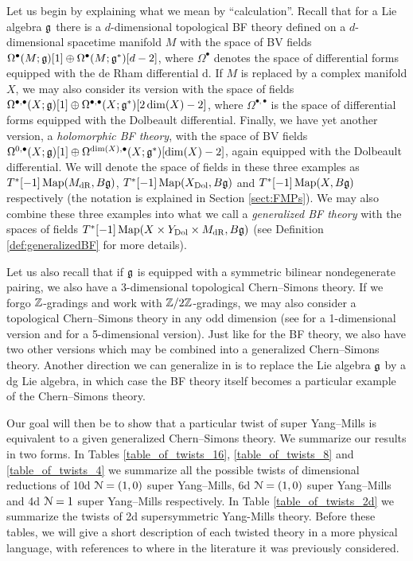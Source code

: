 \documentclass[10pt, oneside]{article}
\begin{document}
Let us begin by explaining what we mean by ``calculation''. Recall that for a Lie algebra $\mathfrak g$ there is a $d$-dimensional topological BF theory defined on a $d$-dimensional spacetime manifold $M$ with the space of BV fields $\Omega^\bullet(M; \mathfrak g)[1]\oplus \Omega^\bullet(M; \mathfrak g^*)[d-2]$, where $\Omega^\bullet$ denotes the space of differential forms equipped with the de Rham differential $\mathrm{d}$. If $M$ is replaced by a complex manifold $X$, we may also consider its version with the space of fields $\Omega^{\bullet, \bullet}(X; \mathfrak g)[1]\oplus \Omega^{\bullet, \bullet}(X; \mathfrak g^*)[2\dim(X)-2]$, where $\Omega^{\bullet, \bullet}$ is the space of differential forms equipped with the Dolbeault differential. Finally, we have yet another version, a \emph{holomorphic BF theory}, with the space of BV fields $\Omega^{0, \bullet}(X; \mathfrak g)[1]\oplus \Omega^{\dim(X), \bullet}(X; \mathfrak g^*)[\dim(X)-2]$, again equipped with the Dolbeault differential. We will denote the space of fields in these three examples as $T^*[-1]\operatorname{Map}(M_{\mathrm{dR}}, B\mathfrak g)$, $T^*[-1]\operatorname{Map}(X_{\mathrm{Dol}}, B\mathfrak g)$ and $T^*[-1]\operatorname{Map}(X, B\mathfrak g)$ respectively (the notation is explained in Section \ref{sect:FMPs}). We may also combine these three examples into what we call a \emph{generalized BF theory} with the spaces of fields $T^*[-1]\operatorname{Map}(X\times Y_{\mathrm{Dol}}\times M_{\mathrm{dR}}, B\mathfrak g)$ (see Definition \ref{def:generalizedBF} for more details).

Let us also recall that if $\mathfrak g$ is equipped with a symmetric bilinear nondegenerate pairing, we also have a 3-dimensional topological Chern--Simons theory. If we forgo $\mathbb Z$-gradings and work with $\mathbb Z/2\mathbb Z$-gradings, we may also consider a topological Chern--Simons theory in any odd dimension (see \cite{AlekseevMnev} for a 1-dimensional version and \cite{BakGustavsson2} for a 5-dimensional version). Just like for the BF theory, we also have two other versions which may be combined into a generalized Chern--Simons theory. Another direction we can generalize in is to replace the Lie algebra $\mathfrak g$ by a dg Lie algebra, in which case the BF theory itself becomes a particular example of the Chern--Simons theory.

Our goal will then be to show that a particular twist of super Yang--Mills is equivalent to a given generalized Chern--Simons theory. We summarize our results in two forms. In Tables \ref{table_of_twists_16}, \ref{table_of_twists_8} and \ref{table_of_twists_4} we summarize all the possible twists of dimensional reductions of 10d $\mathcal N=(1, 0)$ super Yang--Mills, 6d $\mathcal N=(1, 0)$ super Yang--Mills and 4d $\mathcal N=1$ super Yang--Mills respectively.  In Table \ref{table_of_twists_2d} we summarize the twists of 2d supersymmetric Yang-Mills theory. Before these tables, we will give a short description of each twisted theory in a more physical language, with references to where in the literature it was previously considered.
\end{document}
